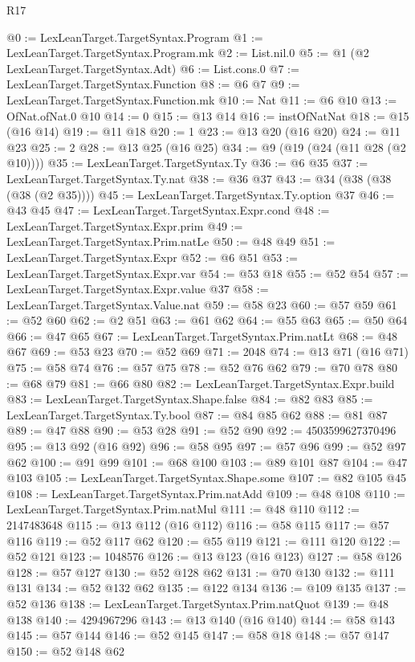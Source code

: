 \begin{lexlean}{R17}
\begin{coremodule}
@0 := LexLeanTarget.TargetSyntax.Program
@1 := LexLeanTarget.TargetSyntax.Program.mk
@2 := List.nil.{0}
@5 := @1 (@2 LexLeanTarget.TargetSyntax.Adt)
@6 := List.cons.{0}
@7 := LexLeanTarget.TargetSyntax.Function
@8 := @6 @7
@9 := LexLeanTarget.TargetSyntax.Function.mk
@10 := Nat
@11 := @6 @10
@13 := OfNat.ofNat.{0} @10
@14 := 0
@15 := @13 @14
@16 := instOfNatNat
@18 := @15 (@16 @14)
@19 := @11 @18
@20 := 1
@23 := @13 @20 (@16 @20)
@24 := @11 @23
@25 := 2
@28 := @13 @25 (@16 @25)
@34 := @9 (@19 (@24 (@11 @28 (@2 @10))))
@35 := LexLeanTarget.TargetSyntax.Ty
@36 := @6 @35
@37 := LexLeanTarget.TargetSyntax.Ty.nat
@38 := @36 @37
@43 := @34 (@38 (@38 (@38 (@2 @35))))
@45 := LexLeanTarget.TargetSyntax.Ty.option @37
@46 := @43 @45
@47 := LexLeanTarget.TargetSyntax.Expr.cond
@48 := LexLeanTarget.TargetSyntax.Expr.prim
@49 := LexLeanTarget.TargetSyntax.Prim.natLe
@50 := @48 @49
@51 := LexLeanTarget.TargetSyntax.Expr
@52 := @6 @51
@53 := LexLeanTarget.TargetSyntax.Expr.var
@54 := @53 @18
@55 := @52 @54
@57 := LexLeanTarget.TargetSyntax.Expr.value @37
@58 := LexLeanTarget.TargetSyntax.Value.nat
@59 := @58 @23
@60 := @57 @59
@61 := @52 @60
@62 := @2 @51
@63 := @61 @62
@64 := @55 @63
@65 := @50 @64
@66 := @47 @65
@67 := LexLeanTarget.TargetSyntax.Prim.natLt
@68 := @48 @67
@69 := @53 @23
@70 := @52 @69
@71 := 2048
@74 := @13 @71 (@16 @71)
@75 := @58 @74
@76 := @57 @75
@78 := @52 @76 @62
@79 := @70 @78
@80 := @68 @79
@81 := @66 @80
@82 := LexLeanTarget.TargetSyntax.Expr.build
@83 := LexLeanTarget.TargetSyntax.Shape.false
@84 := @82 @83
@85 := LexLeanTarget.TargetSyntax.Ty.bool
@87 := @84 @85 @62
@88 := @81 @87
@89 := @47 @88
@90 := @53 @28
@91 := @52 @90
@92 := 4503599627370496
@95 := @13 @92 (@16 @92)
@96 := @58 @95
@97 := @57 @96
@99 := @52 @97 @62
@100 := @91 @99
@101 := @68 @100
@103 := @89 @101 @87
@104 := @47 @103
@105 := LexLeanTarget.TargetSyntax.Shape.some
@107 := @82 @105 @45
@108 := LexLeanTarget.TargetSyntax.Prim.natAdd
@109 := @48 @108
@110 := LexLeanTarget.TargetSyntax.Prim.natMul
@111 := @48 @110
@112 := 2147483648
@115 := @13 @112 (@16 @112)
@116 := @58 @115
@117 := @57 @116
@119 := @52 @117 @62
@120 := @55 @119
@121 := @111 @120
@122 := @52 @121
@123 := 1048576
@126 := @13 @123 (@16 @123)
@127 := @58 @126
@128 := @57 @127
@130 := @52 @128 @62
@131 := @70 @130
@132 := @111 @131
@134 := @52 @132 @62
@135 := @122 @134
@136 := @109 @135
@137 := @52 @136
@138 := LexLeanTarget.TargetSyntax.Prim.natQuot
@139 := @48 @138
@140 := 4294967296
@143 := @13 @140 (@16 @140)
@144 := @58 @143
@145 := @57 @144
@146 := @52 @145
@147 := @58 @18
@148 := @57 @147
@150 := @52 @148 @62

\end{coremodule}
\end{lexlean}
